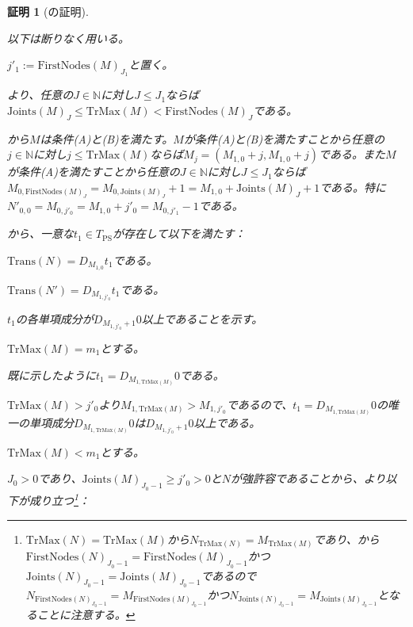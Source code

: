 \documentclass[dvipdfmx,uplatex]{jsarticle}
\theoremstyle{customnonumberbreakfortheorem}
\theoremstyle{customnonumberbreakforproof}
\newtheorem{hideableproof}{証明}
\begin{document}
\begin{hideableproof}[の証明]
	\begin{indented}
		\item 以下は断りなく用いる。
		\item \(j'_1 := \textrm{FirstNodes}(M)_{J_1}\)と置く。
		\item {}より、任意の\(J \in \mathbb{N}\)に対し\(J \leq J_1\)ならば\(\textrm{Joints}(M)_J \leq \textrm{TrMax}(M) < \textrm{FirstNodes}(M)_J\)である。
		\item {}から\(M\)は条件(A)と(B)を満たす。\(M\)が条件(A)と(B)を満たすことから任意の\(j \in \mathbb{N}\)に対し\(j \leq \textrm{TrMax}(M)\)ならば\(M_j = (M_{1,0} + j, M_{1,0} + j)\)である。また\(M\)が条件(A)を満たすことから任意の\(J \in \mathbb{N}\)に対し\(J \leq J_1\)ならば\(M_{0,\textrm{FirstNodes}(M)_J} = M_{0,\textrm{Joints}(M)_J} + 1 = M_{1,0} + \textrm{Joints}(M)_J + 1\)である。特に\(N'_{0,0} = M_{0,j'_0} = M_{1,0} + j'_0 = M_{0,j'_1}-1\)である。
		\item {}から、一意な\(t_1 \in T_{\textrm{PS}}\)が存在して以下を満たす：
		\begin{penumerate}
			\item \(\textrm{Trans}(N) = D_{M_{1,0}} t_1\)である。
			\item \(\textrm{Trans}(N') = D_{M_{1,j'_0}} t_1\)である。
		\end{penumerate}
		\item
		\item \(t_1\)の各単項成分が\(D_{M_{1,j'_0}+1} 0\)以上であることを示す。
		\item \(\textrm{TrMax}(M) = m_1\)とする。
		\begin{indented}
			\item 既に示したように\(t_1 = D_{M_{1,\textrm{TrMax}(M)}} 0\)である。
			\item \(\textrm{TrMax}(M) > j'_0\)より\(M_{1,\textrm{TrMax}(M)} > M_{1,j'_0}\)であるので、\(t_1 = D_{M_{1,\textrm{TrMax}(M)}} 0\)の唯一の単項成分\(D_{M_{1,\textrm{TrMax}(M)}} 0\)は\(D_{M_{1,j'_0}+1} 0\)以上である。
		\end{indented}
		\item
		\item \(\textrm{TrMax}(M) < m_1\)とする。
		\begin{penumerate}
			\item[] \(J_0 > 0\)であり、\(\textrm{Joints}(M)_{J_0-1} \geq j'_0 > 0\)と\(N\)が強許容であることから、より以下が成り立つ\footnote{\(\textrm{TrMax}(N) = \textrm{TrMax}(M)\)から\(N_{\textrm{TrMax}(N)} = M_{\textrm{TrMax}(M)}\)であり、から\(\textrm{FirstNodes}(N)_{J_0-1} = \textrm{FirstNodes}(M)_{J_0-1}\)かつ\(\textrm{Joints}(N)_{J_0-1} = \textrm{Joints}(M)_{J_0-1}\)であるので\(N_{\textrm{FirstNodes}(N)_{J_0-1}} = M_{\textrm{FirstNodes}(M)_{J_0-1}}\)かつ\(N_{\textrm{Joints}(N)_{J_0-1}} = M_{\textrm{Joints}(M)_{J_0-1}}\)となることに注意する。}：

\end{penumerate}
\end{indented}
\end{hideableproof}
\end{document}

